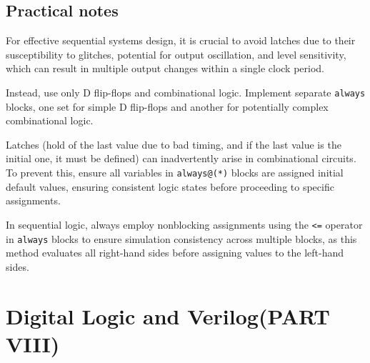 \documentclass[12pt,openany]{book}
\begin{document}
\section{Practical notes}

For effective sequential systems design, it is crucial to avoid latches due to their susceptibility to glitches, potential for output oscillation, and level sensitivity, which can result in multiple output changes within a single clock period. \newline

Instead, use only D flip-flops and combinational logic. Implement separate \texttt{always} blocks, one set for simple D flip-flops and another for potentially complex combinational logic. \newline

Latches (hold of the last value due to bad timing, and if the last value is the initial one, it must be defined) can inadvertently arise in combinational circuits. To prevent this, ensure all variables in \texttt{always@(*)} blocks are assigned initial default values, ensuring consistent logic states before proceeding to specific assignments. \newline 

In sequential logic, always employ nonblocking assignments using the \texttt{<=} operator in \texttt{always} blocks to ensure simulation consistency across multiple blocks, as this method evaluates all right-hand sides before assigning values to the left-hand sides.\newline

\chapter{Digital Logic and Verilog(PART VIII)}
\end{document}
